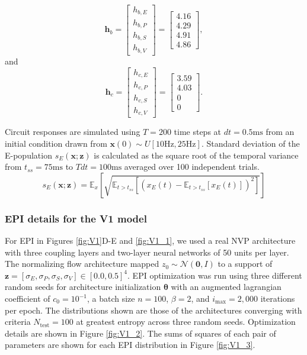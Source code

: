 \documentclass[11pt]{article}
\begin{document}
\begin{equation}
\mathbf{h}_b =  \begin{bmatrix} h_{b,E} \\ h_{b,P} \\ h_{b,S} \\ h_{b,V} \end{bmatrix} =
 \begin{bmatrix} 4.16 \\ 4.29 \\ 4.91 \\ 4.86 \end{bmatrix} ,
\end{equation} 
and
\begin{equation} 
\mathbf{h}_c = \begin{bmatrix} h_{c,E} \\ h_{c,P} \\ h_{c,S} \\ h_{c,V} \end{bmatrix} = 
\begin{bmatrix} 3.59 \\ 4.03 \\ 0 \\ 0 \end{bmatrix}.
\end{equation} 

Circuit responses are simulated using $T = 200$ time steps at $dt = 0.5\text{ms}$ from an initial condition drawn from $\mathbf{x}(0) \sim U\left[10\text{Hz}, 25\text{Hz}\right]$.
Standard deviation of the E-population $s_E(\mathbf{x}; \mathbf{z})$ is calculated as the square root of the temporal variance from $t_{ss} = 75\text{ms}$ to $Tdt = 100\text{ms}$ averaged over 100 independent trials.
\begin{equation}
s_E(\mathbf{x}; \mathbf{z}) =\mathbb{E}_{x}\left[\sqrt{\mathbb{E}_{t > t_{ss}}\left[\left(x_E(t) -\mathbb{E}_{t > t_{ss}}\left[ x_E(t) \right]\right)^2 \right]}\right]
\end{equation}

\subsubsection{EPI details for the V1 model}
For EPI in Figures \ref{fig:V1}D-E and \ref{fig:V1_1}, we used a real NVP architecture with three coupling layers and two-layer neural networks of 50 units per layer.
The normalizing flow architecture mapped $z_0 \sim \mathcal{N}(\mathbf{0}, I)$ to a support of $\mathbf{z} = [\sigma_E, \sigma_P, \sigma_S, \sigma_V] \in [0.0, 0.5]^4$.
EPI optimization was run using three different random seeds for architecture initialization $\bm{\theta}$ with an augmented lagrangian coefficient of $c_0 = 10^{-1}$, a batch size $n=100$, $\beta = 2$, and $i_{\text{max}} = 2,000$ iterations per epoch.
The distributions shown are those of the architectures converging with criteria $N_{\text{test}} = 100$ at greatest entropy across three random seeds.
Optimization details are shown in Figure \ref{fig:V1_2}.
The sums of squares of each pair of parameters are shown for each EPI distribution in Figure \ref{fig:V1_3}.
\end{document}
